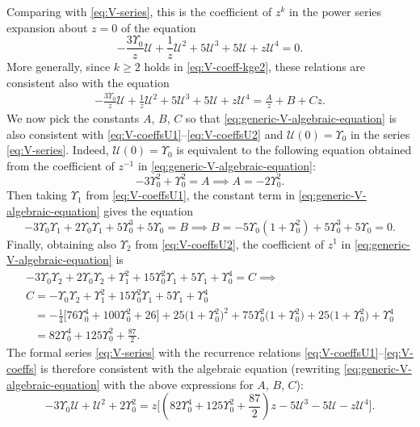 \documentclass[pdftex]{sigma}
\numberwithin{equation}{section}
\begin{document}
Comparing with \eqref{eq:V-series}, this is the coefficient of $z^k$ in the power series expansion about $z=0$ of the equation
\[
-\frac{3\Upsilon_0}{z}\mathcal{U} +\frac{1}{z}\mathcal{U}^2 +5\mathcal{U}^3+ 5\mathcal{U} +z\mathcal{U}^4=0.
\]
More generally, since $k\ge 2$ holds in \eqref{eq:V-coeff-kge2}, these relations are consistent also with the equation
\begin{gather}
-\frac{3\Upsilon_0}{z}\mathcal{U} +\frac{1}{z}\mathcal{U}^2 +5\mathcal{U}^3+ 5\mathcal{U} +z\mathcal{U}^4= \frac{A}{z}+B+Cz.
\label{eq:generic-V-algebraic-equation}
\end{gather}
We now pick the constants $A$, $B$, $C$ so that \eqref{eq:generic-V-algebraic-equation} is also consistent with \eqref{eq:V-coeffsU1}--\eqref{eq:V-coeffsU2} and $\mathcal{U}(0)=\Upsilon_0$ in the series \eqref{eq:V-series}. Indeed, $\mathcal{U}(0)=\Upsilon_0$ is equivalent to the following equation obtained from the coefficient of $z^{-1}$ in \eqref{eq:generic-V-algebraic-equation}:
\[
-3\Upsilon_0^2 + \Upsilon_0^2 = A\implies A=-2\Upsilon_0^2.
\]
Then taking $\Upsilon_1$ from \eqref{eq:V-coeffsU1}, the constant term in \eqref{eq:generic-V-algebraic-equation} gives the equation
\[
-3\Upsilon_0\Upsilon_1 + 2\Upsilon_0\Upsilon_1 + 5\Upsilon_0^3+5\Upsilon_0 =B\implies B=
-5\Upsilon_0(1+\Upsilon_0^2) + 5\Upsilon_0^3+5\Upsilon_0=0.
\]
Finally, obtaining also $\Upsilon_2$ from \eqref{eq:V-coeffsU2}, the coefficient of $z^1$ in \eqref{eq:generic-V-algebraic-equation} is
\begin{gather*}
-3\Upsilon_0\Upsilon_2 + 2\Upsilon_0\Upsilon_2+\Upsilon_1^2 + 15\Upsilon_0^2\Upsilon_1 + 5\Upsilon_1 + \Upsilon_0^4 = C\implies\\
C=-\Upsilon_0\Upsilon_2 +\Upsilon_1^2+15\Upsilon_0^2\Upsilon_1+5\Upsilon_1+\Upsilon_0^4\\
\phantom{C}{}=-\frac{1}{4}\big[76\Upsilon_0^4+100\Upsilon_0^2+26\big]+25\big(1+\Upsilon_0^2\big)^2 + 75\Upsilon_0^2\big(1+\Upsilon_0^2\big) +25\big(1+\Upsilon_0^2\big) + \Upsilon_0^4\\
\phantom{C}{}=82\Upsilon_0^4 +125\Upsilon_0^2 + \frac{87}{2}.
\end{gather*}
The formal series \eqref{eq:V-series} with the recurrence relations \eqref{eq:V-coeffsU1}--\eqref{eq:V-coeffs} is therefore consistent with the algebraic equation (rewriting \eqref{eq:generic-V-algebraic-equation} with the above expressions for $A$, $B$, $C$):
\begin{equation}
 -3\Upsilon_0 \mathcal{U} +\mathcal{U}^2+2\Upsilon_0^2 = z\bigg[\left(82\Upsilon_0^4 + 125\Upsilon_0^2 +\frac{87}{2}\right)z-5\mathcal{U}^3 - 5\mathcal{U} - z\mathcal{U}^4\bigg].
 \label{eq:V-algebraic-equation}
\end{equation}
\end{document}
